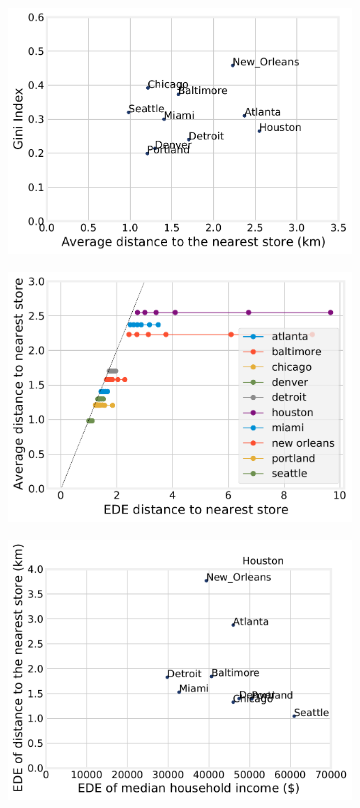 \documentclass[final,3p,times,onecolumn,sort&compress]{elsarticle}
\begin{document}
\begin{figure}[]
    \begin{subfigure}{0.5\textwidth}
        \includegraphics[width=0.9\linewidth]{report/fig/scatter_gini.pdf} 
    \end{subfigure}
    \begin{subfigure}{0.5\textwidth}
        \includegraphics[width=0.9\linewidth]{report/fig/mean_ede.pdf} 
    \end{subfigure}
    \begin{subfigure}{0.5\textwidth}
        \includegraphics[width=0.9\linewidth]{report/fig/scatter_income.pdf} 

\end{subfigure}
\end{figure}
\end{document}
